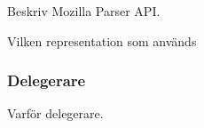Beskriv Mozilla Parser API.

Vilken representation som används

\subsubsection{Delegerare}

Varför delegerare.

%
%
%
%

